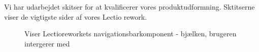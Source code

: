         Vi har udarbejdet skitser for at kvalificerer vores produktudformning. Sktitserne viser de vigtigste sider af vores Lectio rework.
        \begin{figure}[H]
            \centering
            \caption{Viser Lectioreworkets navigationsbarkomponent - bjælken, brugeren intergerer med}
        \end{figure}

